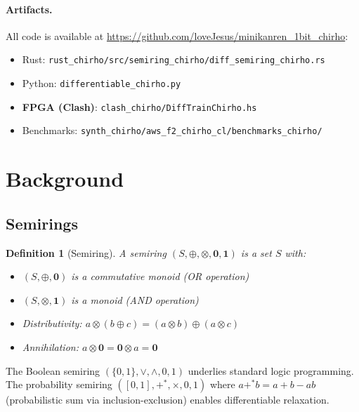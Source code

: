 \documentclass[11pt,a4paper]{article}
\newtheorem{definition}[theorem]{Definition}
\begin{document}
\paragraph{Artifacts.}
All code is available at \url{https://github.com/loveJesus/minikanren_1bit_chirho}:
\begin{itemize}
  \item Rust: \texttt{rust\_chirho/src/semiring\_chirho/diff\_semiring\_chirho.rs}
  \item Python: \texttt{differentiable\_chirho.py}
  \item \textbf{FPGA (Clash)}: \texttt{clash\_chirho/DiffTrainChirho.hs}
  \item Benchmarks: \texttt{synth\_chirho/aws\_f2\_chirho\_cl/benchmarks\_chirho/}
\end{itemize}

\section{Background}
\label{sec:background_chirho}

\subsection{Semirings}
\label{subsec:semirings_chirho}

\begin{definition}[Semiring]
\label{def:semiring_chirho}
A \emph{semiring} $(S, \oplus, \otimes, \mathbf{0}, \mathbf{1})$ is a set $S$ with:
\begin{itemize}
  \item $(S, \oplus, \mathbf{0})$ is a commutative monoid (OR operation)
  \item $(S, \otimes, \mathbf{1})$ is a monoid (AND operation)
  \item Distributivity: $a \otimes (b \oplus c) = (a \otimes b) \oplus (a \otimes c)$
  \item Annihilation: $a \otimes \mathbf{0} = \mathbf{0} \otimes a = \mathbf{0}$
\end{itemize}
\end{definition}

The Boolean semiring $(\{0,1\}, \lor, \land, 0, 1)$ underlies standard logic programming.
The probability semiring $([0,1], +^*, \times, 0, 1)$ where $a +^* b = a + b - ab$ (probabilistic sum via inclusion-exclusion) enables differentiable relaxation.
\end{document}
